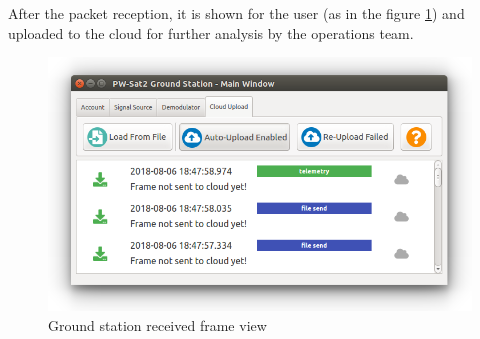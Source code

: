 After the packet reception, it is shown for the user (as in the figure \ref{gs_frame_view}) and uploaded to the cloud for further analysis by the operations team.

\begin{figure}[H]
    \centering
    \includegraphics[width=0.6\paperwidth]{img/3/gs_frame_view.png}
    \caption{Ground station received frame view}
    \label{gs_frame_view}
\end{figure}